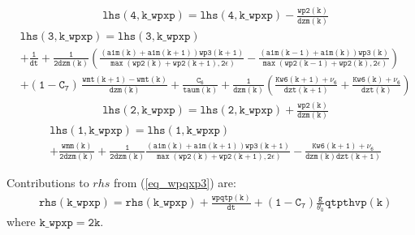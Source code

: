 \documentclass[11pt,fleqn]{article}
\begin{document}
%
\begin{equation}
\begin{split}
&  \mathtt{ lhs(4,k\_wpxp) = lhs(4,k\_wpxp) -\frac{wp2(k)}{dzm(k)} }
\end{split}
\end{equation}
%
\begin{equation}
\begin{split}
&  \mathtt{ lhs(3,k\_wpxp) = lhs(3,k\_wpxp) } \\
&  \mathtt{
+ \frac{1}{dt}
+ \frac{1}{2 dzm(k)}
  \left( 
   \frac{\left(a1m(k)+a1m(k+1)\right) wp3(k+1)}
       {\max\left(wp2(k)+wp2(k+1),2\epsilon\right)}
  -\frac{\left(a1m(k-1)+a1m(k)\right) wp3(k)}
       {\max\left(wp2(k-1)+wp2(k),2\epsilon\right)}
  \right)
   } \\
&  \mathtt{
+ (1-C_7) \, \frac{wmt(k+1)-wmt(k)}{dzm(k)}
+ \frac{C_6}{taum(k)}
+ \frac{1}{dzm(k)} \left(   \frac{Kw6(k+1)+\nu_6}{dzt(k+1)} 
                          + \frac{Kw6(k)+\nu_6}{dzt(k)} \right)
   }
\end{split}
\end{equation}
%
\begin{equation}
\begin{split}
&  \mathtt{ lhs(2,k\_wpxp) = lhs(2,k\_wpxp) +\frac{wp2(k)}{dzm(k)} }
\end{split}
\end{equation}
%
\begin{equation}
\begin{split}
&  \mathtt{ lhs(1,k\_wpxp) = lhs(1,k\_wpxp) } \\
&  \mathtt{
+ \frac{wmm(k)}{2 dzm(k)}
+ \frac{1}{2 dzm(k)}
  \frac{\left(a1m(k)+a1m(k+1)\right) wp3(k+1)}
       {\max\left(wp2(k)+wp2(k+1),2\epsilon\right)}
- \frac{Kw6(k+1)+\nu_6}{dzm(k)dzt(k+1)}
  }
\end{split}
\end{equation}

Contributions to $rhs$ from (\ref{eq_wpqxp3}) are:
%
\begin{equation}
\begin{split}
& \mathtt{
  rhs(k\_wpxp) 
= rhs(k\_wpxp) 
+ \frac{wpqtp(k)}{dt} 
+ (1-C_7) \frac{g}{\theta_0} qtpthvp(k) }
\end{split}
\end{equation}
%
where $\mathtt{k\_wpxp = 2 k}$.
\end{document}
